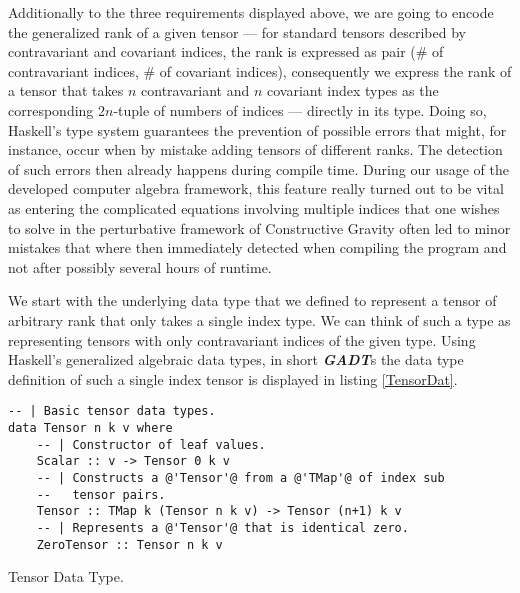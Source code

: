 Additionally to the three requirements displayed above, we are going to encode the generalized rank of a given tensor --- for standard tensors described by contravariant and covariant indices, the rank is expressed as pair ($\#$ of contravariant indices, $\#$ of covariant indices), consequently we express the rank of a tensor that takes $n$ contravariant and $n$ covariant index types as the corresponding $2n$-tuple of numbers of indices --- directly in its type. Doing so, Haskell's type system guarantees the prevention of possible errors that might, for instance, occur when by mistake adding tensors of different ranks. The detection of such errors then already happens during compile time. During our usage of the developed computer algebra framework, this feature really turned out to be vital as entering the complicated equations involving multiple indices that one wishes to solve in the perturbative framework of Constructive Gravity often led to minor mistakes that where then immediately detected when compiling the program and not after possibly several hours of runtime.

We start with the underlying data type that we defined to represent a tensor of arbitrary rank that only takes a single index type. We can think of such a type as representing tensors with only contravariant indices of the given type. Using Haskell's generalized algebraic data types, in short \textit{\textbf{GADT}}s the data type definition of such a single index tensor is displayed in listing \ref{TensorDat}. 

\begin{listing}[hbt!]
\begin{verbatim}
-- | Basic tensor data types.
data Tensor n k v where
    -- | Constructor of leaf values.
    Scalar :: v -> Tensor 0 k v
    -- | Constructs a @'Tensor'@ from a @'TMap'@ of index sub
    --   tensor pairs.
    Tensor :: TMap k (Tensor n k v) -> Tensor (n+1) k v
    -- | Represents a @'Tensor'@ that is identical zero.
    ZeroTensor :: Tensor n k v
\end{verbatim} 
\caption{Tensor Data Type.}\label{TensorDat}
\end{listing}

